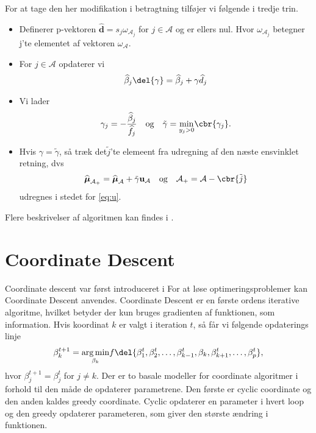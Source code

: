 For at tage den her modifikation i betragtning tilføjer vi følgende i tredje trin. 
\begin{itemize}
\item Definerer p-vektoren $\widehat{\textbf{d}} = s_j \omega_{\mathcal{A}_j}$ for $j \in \mathcal{A}$ og er ellers nul. Hvor $ \omega_{\mathcal{A}_j}$ betegner j'te elementet af vektoren $\omega_{\mathcal{A}}$. 
\item For $j \in \mathcal{A}$ opdaterer vi 
\begin{align*}
\widehat{\beta}_j \del{\gamma} = \widehat{\beta}_j + \gamma \widehat{d}_j 
\end{align*}
\item Vi lader 
\begin{align*}
\gamma_j = - \frac{\widehat{\beta}_j}{\widehat{f}_j} \quad \text{og} \quad \tilde\gamma = \underset{y_j > 0}{\min} \cbr{\gamma_j}. 
\end{align*}
\item Hvis $\gamma = \tilde{\gamma}$, så træk det$ \tilde{j}$'te elemeent fra udregning af den næste ensvinklet retning, dvs 
\begin{align*}
\widehat{\boldsymbol\mu}_{\mathcal{A}_+} = \widehat{\boldsymbol\mu}_\mathcal{A} + \tilde{\gamma} \textbf{u}_\mathcal{A} \quad \text{og} \quad \mathcal{A_+} = \mathcal{A}- \cbr{\tilde{j}}
\end{align*}
udregnes i stedet for \eqref{eq:u}.
\end{itemize}
Flere beskrivelser af algoritmen kan findes i \citep{efron}. 


\section{Coordinate Descent}
Coordinate descent var først introduceret i 
For at løse optimeringsproblemer kan Coordinate Descent anvendes. 
Coordinate Descent er en første ordens iterative algoritme, hvilket betyder der kun bruges gradienten af funktionen, som information. 
Hvis koordinat $k$ er valgt i iteration $t$, så får vi følgende opdaterings linje
\begin{align*}
\beta_k^{t+1} =\underset{ \beta_k}{\arg \min}  f\del{ \beta_1^t, \beta_2^t, \dots, \beta_{k-1}^t, \beta_k, \beta_{k+1}^t, \dots, \beta_p^t  },
\end{align*}
hvor $\beta_j^{t+1} = \beta_j^t$ for $j \neq k$. 
Der er to basale modeller for coordinate algoritmer i forhold til den måde de opdaterer parametrene. Den første er cyclic coordinate og den anden kaldes greedy coordinate. 
Cyclic opdaterer en parameter i hvert loop og den greedy opdaterer parameteren, som giver den største ændring i funktionen. 

